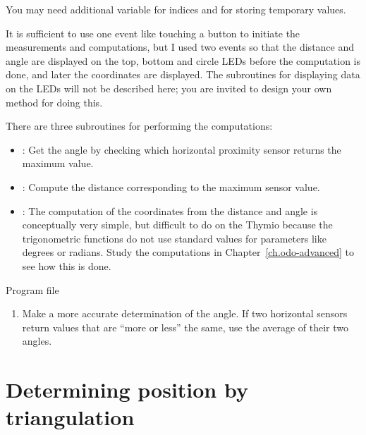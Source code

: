 You may need additional variable for indices and for storing temporary
values.


It is sufficient to use one event like touching a button to initiate the
measurements and computations, but I used two events so that the
distance and angle are displayed on the top, bottom and circle LEDs
before the computation is done, and later the coordinates are displayed.
The subroutines for displaying data on the LEDs will not be described
here; you are invited to design your own method for doing this.

There are three subroutines for performing the computations:

\begin{itemize}

\item {}: Get the angle by checking which horizontal
proximity sensor returns the maximum value.

\item {}: Compute the distance corresponding to the
maximum sensor value.

\item {}: The computation of the coordinates from the
distance and angle is conceptually very simple, but difficult to do on
the Thymio because the trigonometric functions do not use standard
values for parameters like degrees or radians. Study the computations in
Chapter~\ref{ch.odo-advanced} to see how this is done.

\end{itemize}


{\raggedleft \hfill Program file }


\begin{enumerate}

\item Make a more accurate determination of the angle. If two horizontal
sensors return values that are ``more or less'' the same, use the
average of their two angles.

\end{enumerate}

\section{Determining position by triangulation}

